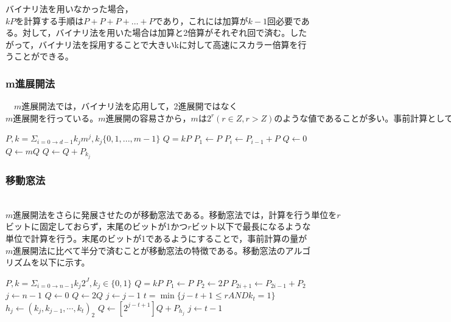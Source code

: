 \documentclass[openany,11pt,papersize]{jsbook}
\begin{document}
バイナリ法を用いなかった場合，$kPを計算する手順はP+P+P+…+Pであり，これには加算がk-1$回必要である。対して，バイナリ法を用いた場合は加算と2倍算がそれぞれ回で済む。したがって，バイナリ法を採用することで大きいkに対して高速にスカラー倍算を行うことができる。


\subsubsection{m進展開法}
　$m$進展開法では，バイナリ法を応用して，2進展開ではなく$m進展開を行っている。m進展開の容易さから，mは2^r(r\in Z, r>Z)のような値であることが多い。事前計算として2P, 3P, ・・・, (m-1)Pを計算する必要があるが，
であるとき，rビット単位で計算を行うことができるので，高速化につながる。以下は，m進展開法のアルゴリズムである。$

\begin{algorithm}[H]                   
\caption{window method}
\label{alg:algW}                          
\begin{algorithmic}                  
\REQUIRE $P, k = \Sigma_{i=0\rightarrow d-1}k_j m^j, k_j\{0,1, ... , m-1\}$
\ENSURE $Q = kP$
\STATE $P_1 \leftarrow P$
\STATE $P_i \leftarrow P_{i-1} + P$
\ENDFOR
\STATE $Q \leftarrow 0$
\STATE $Q \leftarrow mQ$
\STATE $Q \leftarrow Q+P_{k_j}$
\ENDFOR
\end{algorithmic}
\end{algorithm}


\subsubsection{移動窓法}
　$m進展開法をさらに発展させたのが移動窓法である。移動窓法では，計算を行う単位をr$ビットに固定しておらず，末尾のビットが1かつ$r$ビット以下で最長になるような単位で計算を行う。末尾のビットが1であるようにすることで，事前計算の量が$m$進展開法に比べて半分で済むことが移動窓法の特徴である。移動窓法のアルゴリズムを以下に示す。
　
\begin{algorithm}[H]                   
\caption{moving/sliding window method}
\label{alg:algW}                          
\begin{algorithmic}                  
\REQUIRE $P, k=\Sigma_{i=0 \rightarrow n-1}k_j 2^J,k_j \in \{0,1\}$
\ENSURE $Q=kP$
\STATE $P_1 \leftarrow P$
\STATE $P_2 \leftarrow 2P$
\STATE $P_{2i+1} \leftarrow P_{2i-1}+P_2$
\ENDFOR
\STATE $j \leftarrow n-1$
\STATE $Q \leftarrow 0$
\STATE $Q \leftarrow 2Q$
\STATE $j \leftarrow j-1$
\ELSE
\STATE $t= \min \{ j-t+1 \leq r AND k_t = 1 \}$
\STATE $h_j \leftarrow ( k_j, k_{j-1},  \cdots , k_t)_2$
\STATE $Q \leftarrow [2^{j-t+1}]Q + P_{h_j}$
\STATE $j \leftarrow t-1$
\ENDIF
\ENDWHILE
\end{algorithmic}
\end{algorithm}
\end{document}
